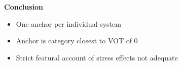 \documentclass[a0paper,portrait,columns=2]{baposter}
\begin{document}
\begin{poster}
{\vspace{.1in}

\textbf{Conclusion}
\vspace{.05in}
\begin{itemize}
	\item One anchor per individual system
	\item Anchor is category closest to VOT of 0
	\item Strict featural account of stress effects not adequate \cite{beckman2011rate}
\end{itemize}

\vspace{.03in}
}














\end{poster}
\end{document}
